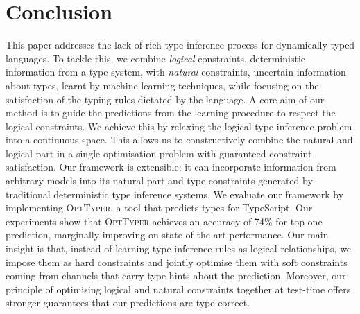 \documentclass[acmsmall, review, anonymous]{acmart}\settopmatter{printfolios=true,printccs=false,printacmref=false}
\newcommand{\projectname}{\textsc{OptTyper}\xspace}
\begin{document}
\section{Conclusion}\label{sec:conclusion}

This paper addresses the lack of rich type inference process for dynamically typed languages.
To tackle this, we combine \textit{logical} constraints, deterministic information from a type system, with \textit{natural} constraints, uncertain information about types, learnt by machine learning techniques, while focusing on the satisfaction of the typing rules dictated by the language.
A core aim of our method is to guide the predictions from the learning procedure to respect the logical constraints.
We achieve this by relaxing the logical type inference problem into a continuous space.
%
This allows us to constructively combine the natural and logical part in a single optimisation problem with guaranteed constraint satisfaction. 
Our framework is extensible: it can incorporate information from arbitrary models into its natural part and type constraints generated by traditional deterministic type inference systems.
We evaluate our framework by implementing \projectname{}, a tool that predicts types for TypeScript.
Our experiments show that \projectname{} achieves an accuracy of 74\% for top-one prediction, marginally improving on state-of-the-art performance.
Our main insight is that, instead of learning type inference rules as logical relationships, we impose them as hard constraints and jointly optimise them with soft constraints coming from channels that carry type hints about the prediction.
Moreover, our principle of optimising logical and natural constraints together at test-time offers stronger guarantees that our predictions are type-correct.
\end{document}

